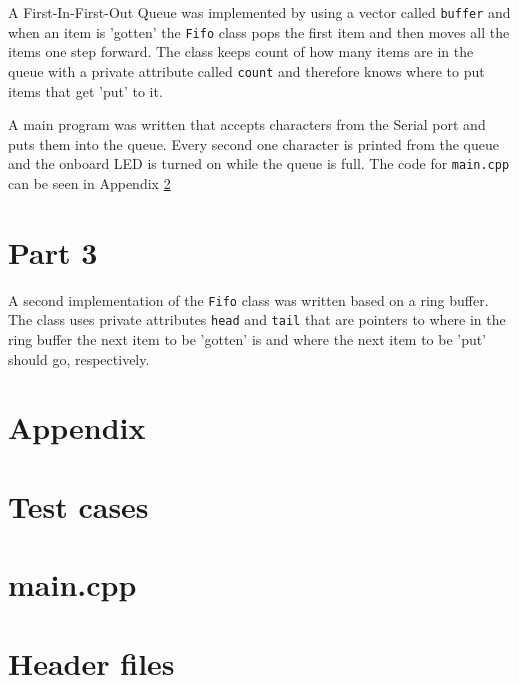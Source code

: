 \documentclass{article}
\begin{document}
A First-In-First-Out Queue was implemented by using a vector called \verb"buffer" and when an item is 'gotten' the \verb"Fifo" class pops the first item and then moves all the items one step forward. The class keeps count of how many items are in the queue with a private attribute called \verb"count" and therefore knows where to put items that get 'put' to it.




A main program was written that accepts characters from the Serial port and puts them into the queue. Every second one character is printed from the queue and the onboard LED is turned on while the queue is full. The code for \verb!main.cpp! can be seen in Appendix \ref{appendix:main.cpp}

\section*{Part 3}
A second implementation of the \verb!Fifo! class was written based on a ring buffer. The class uses private attributes \verb"head" and \verb"tail" that are pointers to where in the ring buffer the next item to be 'gotten' is and where the next item to be 'put' should go, respectively.



\newpage
\section*{Appendix}
\appendix
\section{Test cases}\label{appendix:test_main.cpp}

\section{main.cpp}\label{appendix:main.cpp}

\section{Header files}\label{appendix:headers}


%




\end{document}
